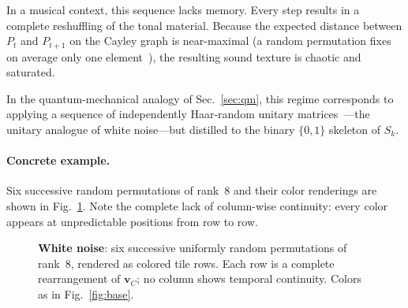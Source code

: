 \documentclass[
  twocolumn,
  aps,
  pra,
  showkeys,
  amsmath,amssymb,
  longbibliography
]{revtex4-2}
\begin{document}
In a musical context, this sequence lacks memory.
Every step results in a complete reshuffling of the tonal
material.
Because the expected distance between $P_t$ and $P_{t+1}$ on
the Cayley graph is near-maximal (a random permutation fixes
on average only one element~\cite{knuth-97}), the resulting
sound texture is chaotic and saturated.

In the quantum-mechanical analogy of
Sec.~\ref{sec:qm}, this regime corresponds to applying a
sequence of independently Haar-random unitary
matrices~\cite{mezzadri-07}---the unitary analogue of white
noise---but distilled to the binary $\{0,1\}$ skeleton of
$S_k$.

\paragraph*{Concrete example.}
Six successive random permutations of rank~$8$ and their
color renderings are shown in Fig.~\ref{fig:white}.
Note the complete lack of column-wise continuity: every color
appears at unpredictable positions from row to row.

\begin{figure}[t]
\centering
{}
\caption{\textbf{White noise}: six successive uniformly random
permutations of rank~$8$, rendered as colored tile rows.
Each row is a complete rearrangement of
$\mathbf{v}_C$; no column shows temporal continuity.
Colors as in Fig.~\ref{fig:base}.}
\label{fig:white}
\end{figure}
\end{document}
